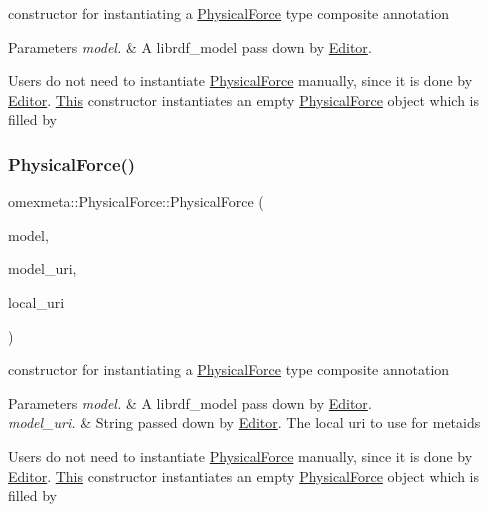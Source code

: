 constructor for instantiating a \hyperlink{classomexmeta_1_1PhysicalForce}{Physical\+Force} type composite annotation 


\begin{DoxyParams}{Parameters}
{\em model.} & A librdf\+\_\+model pass down by \hyperlink{classomexmeta_1_1Editor}{Editor}.\\
\hline
\end{DoxyParams}
Users do not need to instantiate \hyperlink{classomexmeta_1_1PhysicalForce}{Physical\+Force} manually, since it is done by \hyperlink{classomexmeta_1_1Editor}{Editor}. \hyperlink{classThis}{This} constructor instantiates an empty \hyperlink{classomexmeta_1_1PhysicalForce}{Physical\+Force} object which is filled by \mbox{\label{classomexmeta_1_1PhysicalForce_a2ff9aecd73a5356be701d8ba7e9bf71c}} 
\subsubsection{\texorpdfstring{Physical\+Force()}{PhysicalForce()}\hspace{0.1cm}{\footnotesize\ttfamily [3/3]}}
{\footnotesize\ttfamily omexmeta\+::\+Physical\+Force\+::\+Physical\+Force (\begin{DoxyParamCaption}\item[{librdf\+\_\+model $\ast$}]{model,  }\item[{const std\+::string \&}]{model\+\_\+uri,  }\item[{const std\+::string \&}]{local\+\_\+uri }\end{DoxyParamCaption})\hspace{0.3cm}{\ttfamily [explicit]}}



constructor for instantiating a \hyperlink{classomexmeta_1_1PhysicalForce}{Physical\+Force} type composite annotation 


\begin{DoxyParams}{Parameters}
{\em model.} & A librdf\+\_\+model pass down by \hyperlink{classomexmeta_1_1Editor}{Editor}. \\
\hline
{\em model\+\_\+uri.} & String passed down by \hyperlink{classomexmeta_1_1Editor}{Editor}. The local uri to use for metaids\\
\hline
\end{DoxyParams}
Users do not need to instantiate \hyperlink{classomexmeta_1_1PhysicalForce}{Physical\+Force} manually, since it is done by \hyperlink{classomexmeta_1_1Editor}{Editor}. \hyperlink{classThis}{This} constructor instantiates an empty \hyperlink{classomexmeta_1_1PhysicalForce}{Physical\+Force} object which is filled by 

